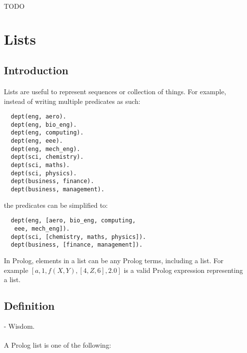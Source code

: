 \documentclass{article}
\begin{document}
\begin{multicols}{2}
  \paragraph{} TODO
  
  \section{Lists}  
  
  \subsection{Introduction}
  
  \paragraph{} Lists are useful to represent sequences or collection of things. For example, instead of writing multiple predicates as such:
  
  \begin{lstlisting}
  dept(eng, aero).
  dept(eng, bio_eng).
  dept(eng, computing).
  dept(eng, eee).
  dept(eng, mech_eng).
  dept(sci, chemistry).
  dept(sci, maths).
  dept(sci, physics).
  dept(business, finance).
  dept(business, management).
  \end{lstlisting}
  
  the predicates can be simplified to:
  
  \begin{lstlisting}
  dept(eng, [aero, bio_eng, computing,
   eee, mech_eng]).
  dept(sci, [chemistry, maths, physics]).
  dept(business, [finance, management]).
  \end{lstlisting}
  
  In Prolog, elements in a list can be any Prolog terms, including a list. For example $[a, 1, f(X, Y), [4, Z, 6], 2.0]$ is a valid Prolog expression representing a list.
  
  \subsection{Definition}
  
   - Wisdom.
  
  \paragraph{} A Prolog list is one of the following:
  

\end{multicols}
\end{document}
